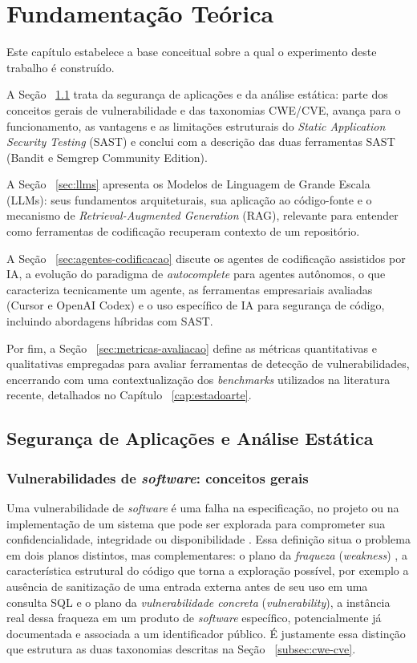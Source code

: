 \chapter{Fundamentação Teórica}\label{cap:fundTeoric}
Este capítulo estabelece a base conceitual sobre a qual o experimento deste trabalho é construído. 

A Seção ~\ref{sec:seguranca-aplicacoes} trata da segurança de aplicações e da análise estática: parte dos conceitos gerais de vulnerabilidade e das taxonomias CWE/CVE, avança para o funcionamento, as vantagens e as limitações estruturais do \textit{Static Application Security Testing} (SAST) e conclui com a descrição das duas ferramentas SAST  (Bandit e Semgrep Community Edition). 

A Seção ~\ref{sec:llms} apresenta os Modelos de Linguagem de Grande Escala (LLMs): seus fundamentos arquiteturais, sua aplicação ao código-fonte e o mecanismo de \textit{Retrieval-Augmented Generation} (RAG), relevante para entender como ferramentas de codificação recuperam contexto de um repositório. 

A Seção ~\ref{sec:agentes-codificacao} discute os agentes de codificação assistidos por IA, a evolução do paradigma de \textit{autocomplete} para agentes autônomos, o que caracteriza tecnicamente um agente, as ferramentas empresariais avaliadas (Cursor e OpenAI Codex) e o uso específico de IA para segurança de código, incluindo abordagens híbridas com SAST. 

Por fim, a Seção ~\ref{sec:metricas-avaliacao} define as métricas quantitativas e qualitativas empregadas para avaliar ferramentas de detecção de vulnerabilidades, encerrando com uma contextualização dos \textit{benchmarks} utilizados na literatura recente, detalhados no Capítulo ~\ref{cap:estadoarte}.


\section{Segurança de Aplicações e Análise Estática}\label{sec:seguranca-aplicacoes}
\subsection{Vulnerabilidades de \textit{software}: conceitos gerais}\label{subsec:vulnerabilidades-software}
Uma vulnerabilidade de \textit{software} é uma falha na especificação, no projeto ou na implementação de um sistema que pode ser explorada para comprometer sua confidencialidade, integridade ou disponibilidade \cite{MITRECWE2024}. Essa definição situa o problema em dois planos distintos, mas complementares: o plano da \textit{fraqueza} (\textit{weakness}) , a característica estrutural do código que torna a exploração possível, por exemplo a ausência de sanitização de uma entrada externa antes de seu uso em uma consulta SQL  e o plano da \textit{vulnerabilidade concreta} (\textit{vulnerability}), a instância real dessa fraqueza em um produto de \textit{software} específico, potencialmente já documentada e associada a um identificador público. É justamente essa distinção que estrutura as duas taxonomias descritas na Seção  ~\ref{subsec:cwe-cve}.


